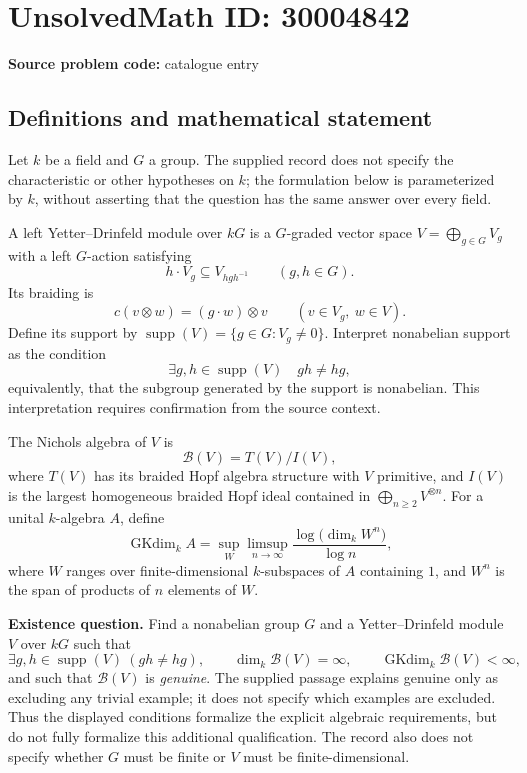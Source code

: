 \documentclass[11pt]{article}
\begin{document}
\section*{UnsolvedMath ID: 30004842}
\textbf{Source problem code:} catalogue entry
\subsection{Definitions and mathematical statement}
Let \(k\) be a field and \(G\) a group. The supplied record does not specify the characteristic or other hypotheses on \(k\); the formulation below is parameterized by \(k\), without asserting that the question has the same answer over every field.

A left Yetter--Drinfeld module over \(kG\) is a \(G\)-graded vector space \(V=\bigoplus_{g\in G}V_g\) with a left \(G\)-action satisfying
\[
h\cdot V_g\subseteq V_{hgh^{-1}}\qquad(g,h\in G).
\]
Its braiding is
\[
c(v\otimes w)=(g\cdot w)\otimes v\qquad(v\in V_g,\ w\in V).
\]
Define its support by \(\operatorname{supp}(V)=\{g\in G:V_g\ne0\}\). Interpret nonabelian support as the condition
\[
\exists g,h\in\operatorname{supp}(V)\quad gh\ne hg,
\]
equivalently, that the subgroup generated by the support is nonabelian. This interpretation requires confirmation from the source context.

The Nichols algebra of \(V\) is
\[
\mathcal B(V)=T(V)/I(V),
\]
where \(T(V)\) has its braided Hopf algebra structure with \(V\) primitive, and \(I(V)\) is the largest homogeneous braided Hopf ideal contained in \(\bigoplus_{n\ge2}V^{\otimes n}\). For a unital \(k\)-algebra \(A\), define
\[
\operatorname{GKdim}_k A
=\sup_W\limsup_{n\to\infty}
\frac{\log\bigl(\dim_k W^n\bigr)}{\log n},
\]
where \(W\) ranges over finite-dimensional \(k\)-subspaces of \(A\) containing \(1\), and \(W^n\) is the span of products of \(n\) elements of \(W\).

\textbf{Existence question.} Find a nonabelian group \(G\) and a Yetter--Drinfeld module \(V\) over \(kG\) such that
\[
\exists g,h\in\operatorname{supp}(V)\ (gh\ne hg),\qquad
\dim_k\mathcal B(V)=\infty,\qquad
\operatorname{GKdim}_k\mathcal B(V)<\infty,
\]
and such that \(\mathcal B(V)\) is \emph{genuine}. The supplied passage explains genuine only as excluding any trivial example; it does not specify which examples are excluded. Thus the displayed conditions formalize the explicit algebraic requirements, but do not fully formalize this additional qualification. The record also does not specify whether \(G\) must be finite or \(V\) must be finite-dimensional.
\end{document}
